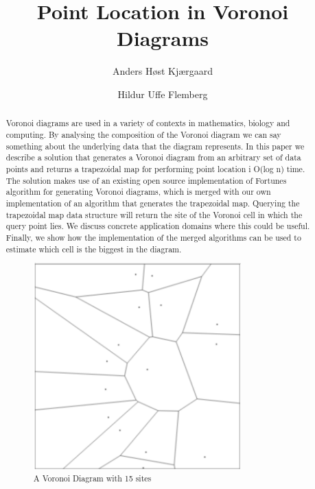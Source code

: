 \documentclass[oribibl]{llncs}
\begin{document}

\mainmatter              %
\title{Point Location in Voronoi Diagrams}

\author{Anders Høst Kjærgaard \and Hildur Uffe Flemberg\\
}



\maketitle              %

\begin{abstract}
Voronoi diagrams are used in a variety of contexts in mathematics, biology and computing. By analysing the composition of the Voronoi diagram we can say something  about the underlying data that the diagram represents. In this paper we describe a solution that generates a Voronoi diagram from an arbitrary set of data points and returns a trapezoidal map for performing point location i O(log n) time. The solution makes use of an existing open source implementation of Fortunes algorithm for generating Voronoi diagrams, which is merged with our own implementation of an algorithm that generates the trapezoidal map. Querying the trapezoidal map data structure will return the site of the Voronoi cell in which the query point lies. We discuss concrete application domains where this could be useful. Finally, we show how the implementation of the merged algorithms can be used to estimate which cell is the biggest in the diagram.

\begin{figure}[t]
    \centering
      \includegraphics[height=80mm]{images/voronoi_diagram.pdf}
    \caption{A Voronoi Diagram with 15 sites}
    \label{fig:Pipes2IFCWorkflow}
\end{figure}


\end{abstract}











\end{document}

